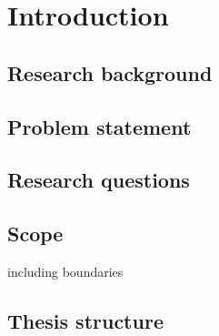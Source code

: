 \chapter{Introduction}
\label{sec:introduction}

\section{Research background}

\section{Problem statement}

\section{Research questions}

\section{Scope}
including boundaries

\section{Thesis structure}
